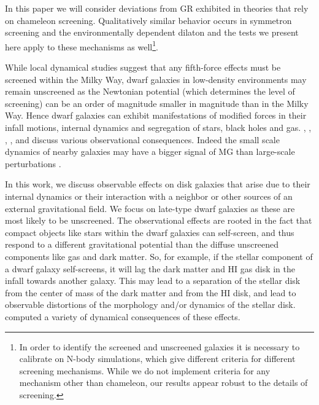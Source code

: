 \documentclass[twocolappendix, numberedappendix]{emulateapj}
\begin{document}
In this paper we will consider deviations from GR exhibited in
theories that rely on chameleon screening.
Qualitatively similar behavior occurs in symmetron screening
\citep{hinterbichler10} and the environmentally dependent
dilaton \citep{brax10} and the tests we  present here apply
to these mechanisms as well\footnote{In order to identify the screened and
  unscreened galaxies it is necessary to calibrate on N-body simulations,
  which give different criteria for different screening mechanisms. While
  we do not implement criteria for any mechanism other than chameleon,  
  our results appear robust to the details of screening.}. 

While local dynamical studies suggest that any fifth-force effects must be
screened within the Milky Way, 
dwarf galaxies in low-density environments may remain unscreened as the 
Newtonian potential (which determines the level of screening) can be an order of
magnitude 
smaller in magnitude than in the Milky Way. Hence dwarf galaxies can
exhibit manifestations of modified forces in  their infall motions, 
internal dynamics and segregation of stars, black holes and gas. \citet{hui09}, \citet{hui10}, \citet{bhuvjake2011},
\citet{changhui}, \citet{Davis2012} and 
\citet{jainvinu2012}
discuss various observational consequences. Indeed the small scale dynamics of 
nearby galaxies may have a bigger signal of MG than large-scale perturbations 
\citep[see][for a discussion of observational approaches]{jain11}.
 
In this work, we discuss observable effects on disk galaxies that  arise due to 
their internal dynamics or their interaction with a neighbor or other sources of
an external gravitational field. We focus on late-type dwarf galaxies as these
are most likely to be unscreened. The observational effects are rooted in the
fact that compact objects like stars within
the dwarf galaxies can self-screen, and thus respond to a different
gravitational potential than the diffuse unscreened components like gas and dark matter.
So, for example, if the stellar component of a dwarf galaxy self-screens,
it will lag the dark matter and HI gas disk in the infall towards
another galaxy. This may lead to a separation of the stellar disk from the
center of mass of the dark matter and from the HI disk, and lead to
observable distortions of the morphology and/or dynamics of the stellar disk.
\citet{bhuvjake2011} computed a variety of dynamical consequences of these
effects. 
 
\end{document}
